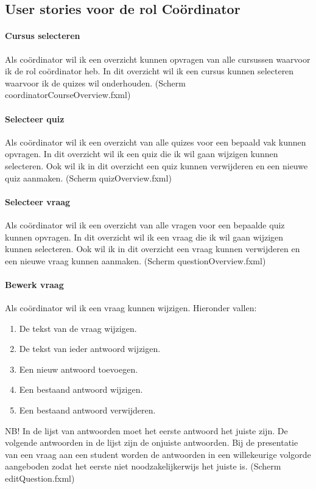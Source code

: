 \documentclass[11pt, a4paper]{article}
\begin{document}
\subsection{User stories voor de rol Co\"ordinator}

\paragraph{Cursus selecteren} Als co\"ordinator wil ik een overzicht kunnen opvragen van alle cursussen waarvoor ik de rol co\"ordinator heb.
In dit overzicht wil ik een cursus kunnen selecteren waarvoor ik de quizes wil onderhouden. (Scherm coordinatorCourseOverview.fxml)

\paragraph{Selecteer quiz} Als co\"ordinator wil ik een overzicht van alle quizes voor een bepaald vak kunnen opvragen.
In dit overzicht wil ik een quiz die ik wil gaan wijzigen kunnen selecteren.
Ook wil ik in dit overzicht een quiz kunnen verwijderen en een nieuwe quiz aanmaken. (Scherm quizOverview.fxml)

\paragraph{Selecteer vraag} Als co\"ordinator wil ik een overzicht van alle vragen voor een bepaalde quiz kunnen opvragen.
In dit overzicht wil ik een vraag die ik wil gaan wijzigen kunnen selecteren.
Ook wil ik in dit overzicht een vraag kunnen verwijderen en een nieuwe vraag kunnen aanmaken. (Scherm questionOverview.fxml)

\paragraph{Bewerk vraag} Als co\"ordinator wil ik een vraag kunnen wijzigen. Hieronder vallen:
\begin{enumerate}
\item De tekst van de vraag wijzigen.
\item De tekst van ieder antwoord wijzigen.
\item Een nieuw antwoord toevoegen.
\item Een bestaand antwoord wijzigen.
\item Een bestaand antwoord verwijderen.
\end{enumerate}

NB! In de lijst van antwoorden moet het eerste antwoord het juiste zijn.
De volgende antwoorden in de lijst zijn de onjuiste antwoorden.
Bij de presentatie van een vraag aan een student worden de antwoorden in een willekeurige volgorde aangeboden zodat het eerste niet noodzakelijkerwijs het juiste is. (Scherm editQuestion.fxml)
\end{document}
